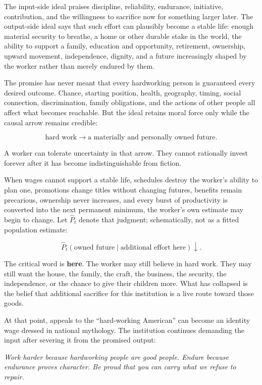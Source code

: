 \documentclass[11pt,oneside]{article}
\renewenvironment{quote}
  {\begin{tcolorbox}[
      enhanced,
      breakable,
      colback=ManifestLight,
      colframe=ManifestRule,
      boxrule=0pt,
      leftrule=3pt,
      arc=0pt,
      outer arc=0pt,
      left=10pt,right=10pt,top=8pt,bottom=8pt,
      before skip=0.8em,after skip=0.8em
    ]\itshape}
  {\end{tcolorbox}}
\begin{document}
The input-side ideal praises discipline, reliability, endurance,
initiative, contribution, and the willingness to sacrifice now for
something larger later. The output-side ideal says that such effort can
plausibly become a stable life: enough material security to breathe, a
home or other durable stake in the world, the ability to support a
family, education and opportunity, retirement, ownership, upward
movement, independence, dignity, and a future increasingly shaped by the
worker rather than merely endured by them.

The promise has never meant that every hardworking person is guaranteed
every desired outcome. Chance, starting position, health, geography,
timing, social connection, discrimination, family obligations, and the
actions of other people all affect what becomes reachable. But the ideal
retains moral force only while the causal arrow remains credible:

\[
\text{hard work}
\longrightarrow
\text{a materially and personally owned future}.
\]

A worker can tolerate uncertainty in that arrow. They cannot rationally
invest forever after it has become indistinguishable from fiction.

When wages cannot support a stable life, schedules destroy the worker's
ability to plan one, promotions change titles without changing futures,
benefits remain precarious, ownership never increases, and every burst
of productivity is converted into the next permanent minimum, the
worker's own estimate may begin to change. Let \(\widehat P_t\) denote
that judgment; schematically, not as a fitted population estimate:

\[
\widehat P_t(\text{owned future}\mid\text{additional effort here})\downarrow.
\]

The critical word is \textbf{here}. The worker may still believe in hard
work. They may still want the house, the family, the craft, the
business, the security, the independence, or the chance to give their
children more. What has collapsed is the belief that additional
sacrifice for this institution is a live route toward those goods.

At that point, appeals to the ``hard-working American'' can become an
identity wage dressed in national mythology. The institution continues
demanding the input after severing it from the promised output:

\begin{quote}
Work harder because hardworking people are good people. Endure because
endurance proves character. Be proud that you can carry what we refuse
to repair.
\end{quote}
\end{document}
